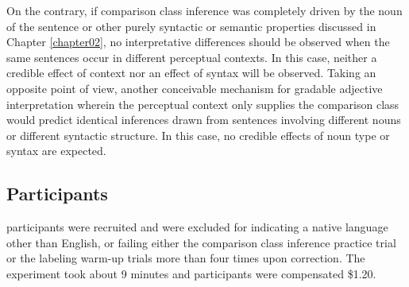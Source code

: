 On the contrary, if comparison class inference was completely driven by the noun of the sentence or other purely syntactic or semantic properties discussed in Chapter \ref{chapter02}, no interpretative differences should be observed when the same sentences occur in different perceptual contexts. In this case, neither a credible effect of context nor an effect of syntax will be observed. Taking an opposite point of view, another conceivable mechanism for gradable adjective interpretation wherein the perceptual context only supplies the comparison class would predict identical inferences drawn from sentences involving different nouns or different syntactic structure. In this case, no credible effects of noun type or syntax are expected. 

\subsection{Participants}
 participants were recruited and  were excluded for indicating a native language other than English, or failing either the comparison class inference practice trial or the labeling warm-up trials more than four times upon correction. The experiment took about 9 minutes and participants were compensated \$1.20. 
